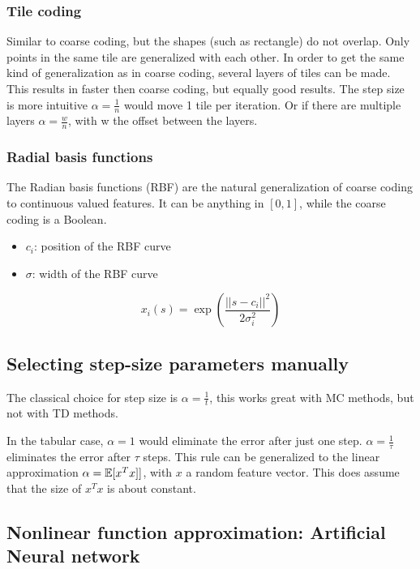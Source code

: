 \subsubsection{Tile coding}
Similar to coarse coding, but the shapes (such as rectangle) do not overlap. Only points in the same tile are generalized with each other. In order to get the same kind of generalization as in coarse coding, several layers of tiles can be made. This results in faster then coarse coding, but equally good results. The step size is more intuitive $\alpha = \frac{1}{n}$ would move 1 tile per iteration. Or if there are multiple layers $\alpha = \frac{w}{n}$, with w the offset between the layers.

\subsubsection{Radial basis functions}
The Radian basis functions (RBF) are the natural generalization of coarse coding to continuous valued features. It can be anything in $[0,1]$, while the coarse coding is a Boolean.

\begin{itemize}
	\item $c_i$: position of the RBF curve
	\item $\sigma$: width of the RBF curve
\end{itemize}

\begin{equation}
x_i(s) = \exp \left( \frac{|| s - c_i ||^2}{2 \sigma_i^2} \right)
\end{equation}

\subsection{Selecting step-size parameters manually}

The classical choice for step size is $\alpha = \frac{1}{t}$, this works great with MC methods, but not with TD methods.

In the tabular case, $\alpha=1$ would eliminate the error after just one step. $\alpha=\frac{1}{\tau}$ eliminates the error after $\tau$ steps. This rule can be generalized to the linear approximation $\alpha = \operatorname{\mathbb{E}}[x^Tx]]$, with $x$ a random feature vector. This does assume that the size of $x^Tx$ is about constant.

\subsection{Nonlinear function approximation: Artificial Neural network}

